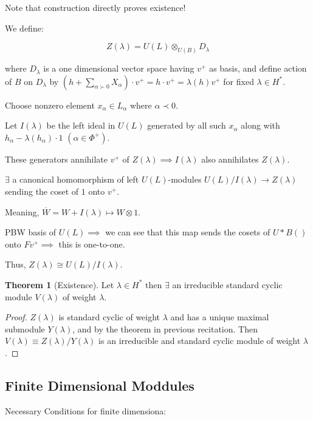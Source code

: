 \documentclass{article}
\theoremstyle{definition}
\newtheorem{theorem}{Theorem}
\begin{document}
    Note that construction directly proves existence!

    We define:

    \[
        Z(\lambda) = U(L) \otimes_{U(B)} D_\lambda
    \]

    where \(D_\lambda\) is a one dimensional vector space having \(v^+\) as basis, and define action of \(B\) on \(D_\lambda\) by \((h+\sum_{\alpha \succ 0} X_\alpha)\cdot v^+ = h \cdot v^+ = \lambda(h)v^+\) for fixed \(\lambda \in H^{\ast}\).  

    Choose nonzero element \(x_\alpha \in L_\alpha\) where \(\alpha \prec 0\).

    Let \(I(\lambda)\) be the left ideal in \(U(L)\) generated by all such \(x_\alpha\) along with \(h_{\alpha} - \lambda(h_\alpha)\cdot 1\) \((\alpha \in \Phi^+)\).
    
    These generators annihilate \(v^+\) of \(Z(\lambda) \implies I(\lambda)\) also annihilates \(Z(\lambda)\).

    \(\exists\) a canonical homomorphism of left \(U(L)\)-modules \(U(L) / I(\lambda) \to Z(\lambda)\) sending the coset of \(1\) onto \(v^+\).

    Meaning, \(\overline{W} = W + I(\lambda) \mapsto W \otimes 1\).

    PBW basis of \(U(L)\implies\) we can see that this map sends the cosets of \(U*B()\) onto \(Fv^+ \implies \) this is one-to-one.

    Thus, \(Z(\lambda) \cong U(L) / I(\lambda)\).

    \begin{theorem}
        [Existence] Let \(\lambda \in H^{\ast}\) then \(\exists\) an irreducible standard cyclic module \(V(\lambda)\) of weight \(\lambda\).
    \end{theorem}

    \begin{proof}
        \(Z(\lambda)\) is standard cyclic of weight \(\lambda\) and has a unique maximal submodule \(Y(\lambda)\), and by the theorem in previous recitation. Then \(V(\lambda) \equiv  Z(\lambda) / Y(\lambda)\) is an irreducible and standard cyclic module of weight \(\lambda\).
    \end{proof}

    \subsection*{Finite Dimensional Moddules}

    Necessary Conditions for finite dimensiona:
\end{document}
